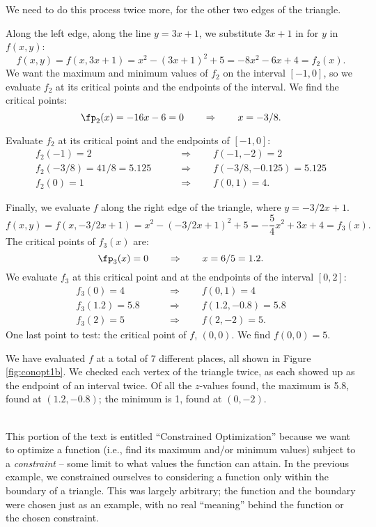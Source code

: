 {We need to do this process twice more, for the other two edges of the triangle.

Along the left edge, along the line $y=3x+1$, we substitute $3x+1$ in for $y$ in $f(x,y)$:
$$f(x,y) = f(x,3x+1) = x^2-(3x+1)^2+5 = -8x^2-6x+4 = f_2(x).$$
We want the maximum and minimum values of $f_2$ on the interval $[-1,0]$, so we evaluate $f_2$ at its critical points and the endpoints of the interval. We find the critical points:
$$\fp_2(x) = -16x-6=0 \qquad \Rightarrow \qquad x=-3/8.$$

Evaluate $f_2$ at its critical point and the endpoints of $[-1,0]$:
\begin{align*}
f_2(-1) = 2 \qquad&\Rightarrow\qquad f(-1,-2) = 2\\
f_2(-3/8) = 41/8=5.125  \qquad&\Rightarrow \qquad f(-3/8,-0.125) = 5.125\\
f_2(0) = 1 \qquad&\Rightarrow \qquad f(0,1) = 4.
\end{align*}

Finally, we evaluate $f$ along the right edge of the triangle, where $y = -3/2x+1$. 
$$f(x,y) = f(x,-3/2x+1) = x^2-(-3/2x+1)^2+5 = -\frac54x^2+3x+4=f_3(x).$$
The critical points of $f_3(x)$ are:
$$\fp_3(x) = 0 \qquad \Rightarrow \qquad x=6/5=1.2.$$
We evaluate $f_3$ at this critical point and at the endpoints of the interval $[0,2]$:
\begin{align*}
f_3(0) = 4 \qquad&\Rightarrow\qquad f(0,1) = 4\\
f_3(1.2) = 5.8  \qquad&\Rightarrow \qquad f(1.2,-0.8) = 5.8\\
f_3(2) = 5 \qquad&\Rightarrow \qquad f(2,-2) = 5.
\end{align*}
One last point to test: the critical point of $f$, $(0,0)$. We find $f(0,0) = 5$.

We have evaluated $f$ at a total of 7 different places, all shown in Figure \ref{fig:conopt1b}. We checked each vertex of the triangle twice, as each showed up as the endpoint of an interval twice. Of all the $z$-values found, the maximum is 5.8, found at $(1.2,-0.8)$; the minimum is 1, found at $(0,-2)$. 
}\\

This portion of the text is entitled ``Constrained Optimization'' because we want to optimize a function (i.e., find its maximum and/or minimum values) subject to a \textit{constraint} -- some limit to what values the function can attain. In the previous example, we constrained ourselves to considering a function only within the boundary of a triangle. This was largely arbitrary; the function and the boundary were chosen just as an example, with no real ``meaning'' behind the function or the chosen constraint.

